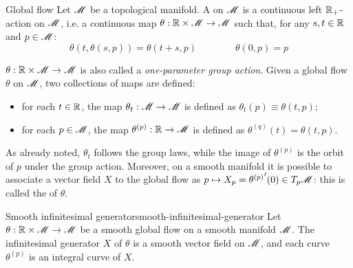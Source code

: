 \begin{definition}{Global flow}{}
  Let $ \mathscr{M} $ be a topological manifold. A  on $ \mathscr{M} $ is a continuous left $ \mathbb{R}_+ $-action on $ \mathscr{M} $, i.e. a continuous map $ \theta : \mathbb{R} \times \mathscr{M} \rightarrow \mathscr{M} $ such that, for any $ s,t \in \mathbb{R} $ and $ p \in \mathscr{M} $:
  \begin{equation}
    \theta(t , \theta(s , p)) = \theta(t + s , p)
    \qquad \qquad
    \theta(0 , p) = p
  \end{equation}
\end{definition}

$ \theta : \mathbb{R} \times \mathscr{M} \rightarrow \mathscr{M} $ is also called a \emph{one-parameter group action}. Given a global flow $ \theta $ on $ \mathscr{M} $, two collections of maps are defined:
\begin{itemize}
  \item for each $ t \in \mathbb{R} $, the map $ \theta_t : \mathscr{M} \rightarrow \mathscr{M} $ is defined as $ \theta_t(p) \equiv \theta(t,p) $;
  \item for each $ p \in \mathscr{M} $, the map $ \theta^{(p)} : \mathbb{R} \rightarrow \mathscr{M} $ is defined as $ \theta^{(q)}(t) = \theta(t,p) $.
\end{itemize}
As already noted, $ \theta_t $ follows the group laws, while the image of $ \theta^{(p)} $ is the orbit of $ p $ under the group action.
Moreover, on a smooth manifold it is possible to associate a vector field $ X $ to the global flow as $ p \mapsto X_p = {\theta^{(p)}}'(0) \in T_p\mathscr{M} $: this is called the  of $ \theta $.

\begin{proposition}{Smooth infinitesimal generator}{smooth-infinitesimal-generator}
  Let $ \theta : \mathbb{R} \times \mathscr{M} \rightarrow \mathscr{M} $ be a smooth global flow on a smooth manifold $ \mathscr{M} $. The infinitesimal generator $ X $ of $ \theta $ is a smooth vector field on $ \mathscr{M} $, and each curve $ \theta^{(p)} $ is an integral curve of $ X $.
\end{proposition}

